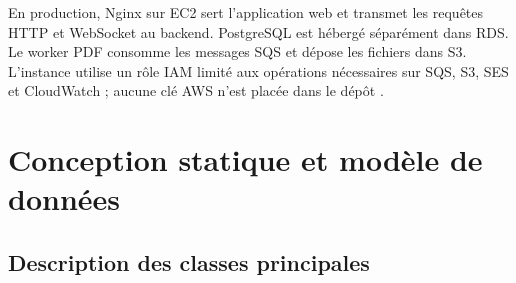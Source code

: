En production, Nginx sur EC2 sert l'application web et transmet les requêtes HTTP et WebSocket au backend. PostgreSQL est hébergé séparément dans RDS. Le worker PDF consomme les messages SQS et dépose les fichiers dans S3. L'instance utilise un rôle IAM limité aux opérations nécessaires sur SQS, S3, SES et CloudWatch ; aucune clé AWS n'est placée dans le dépôt \cite{awsec2iam}.


\section{Conception statique et modèle de données}

\subsection{Description des classes principales}

